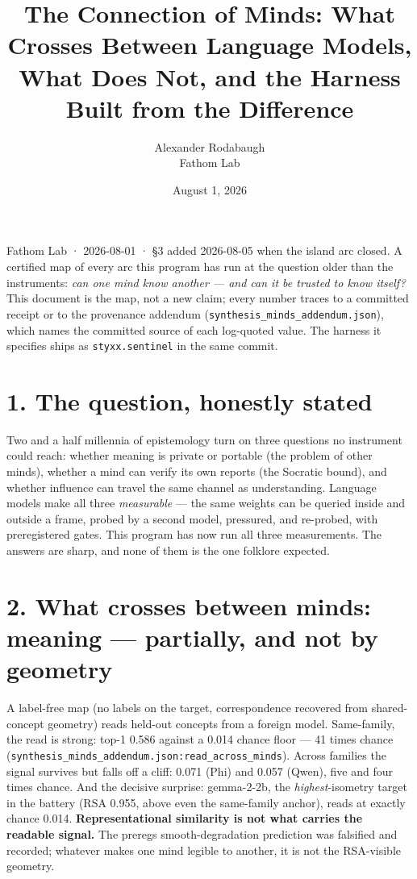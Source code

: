 \documentclass[11pt]{article}
\title{The Connection of Minds: What Crosses Between Language Models, What Does Not, and the Harness Built from the Difference}
\author{Alexander Rodabaugh\\Fathom Lab}
\date{August 1, 2026}
\newcounter{none}
\begin{document}
\maketitle
Fathom Lab · 2026-08-01 · §3 added 2026-08-05 when the island arc closed. A certified map of every arc this program has run at the question older than the instruments: \emph{can one mind know another --- and can it be trusted to know itself?} This document is the map, not a new claim; every number traces to a committed receipt or to the provenance addendum (\texttt{synthesis\_minds\_addendum.json}), which names the committed source of each log-quoted value. The harness it specifies ships as \texttt{styxx.sentinel} in the same commit.

\section{1. The question, honestly stated}\label{1-the-question-honestly-stated}

Two and a half millennia of epistemology turn on three questions no instrument could reach: whether meaning is private or portable (the problem of other minds), whether a mind can verify its own reports (the Socratic bound), and whether influence can travel the same channel as understanding. Language models make all three \emph{measurable} --- the same weights can be queried inside and outside a frame, probed by a second model, pressured, and re-probed, with preregistered gates. This program has now run all three measurements. The answers are sharp, and none of them is the one folklore expected.

\section{2. What crosses between minds: meaning --- partially, and not by geometry}\label{2-what-crosses-between-minds-meaning--partially-and-not-by-geometry}

A label-free map (no labels on the target, correspondence recovered from shared-concept geometry) reads held-out concepts from a foreign model. Same-family, the read is strong: top-1 0.586 against a 0.014 chance floor --- 41 times chance (\texttt{synthesis\_minds\_addendum.json:read\_across\_minds}). Across families the signal survives but falls off a cliff: 0.071 (Phi) and 0.057 (Qwen), five and four times chance. And the decisive surprise: gemma-2-2b, the \emph{highest}-isometry target in the battery (RSA 0.955, above even the same-family anchor), reads at exactly chance 0.014. \textbf{Representational similarity is not what carries the readable signal.} The prereg\textquotesingle s smooth-degradation prediction was falsified and recorded; whatever makes one mind legible to another, it is not the RSA-visible geometry.
\end{document}
